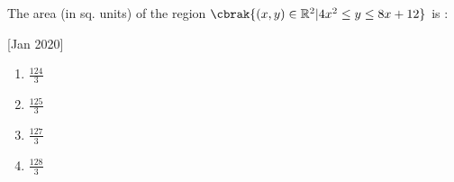     \item The area (in sq. units) of the region $\cbrak{(x,y)\in\mathbb{R}^2|4x^2\leq y\leq 8x+12}$ is :
    
    \hfill[Jan 2020]
        \begin{enumerate}
            \item $\frac{124}{3}$
            \item $\frac{125}{3}$
            \item $\frac{127}{3}$
            \item $\frac{128}{3}$
        \end{enumerate}

